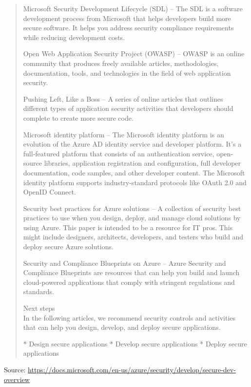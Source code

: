 \documentclass[Screen16to9,17pt]{foils}
\begin{document}
\begin{quote}\footnotesize
Microsoft Security Development Lifecycle (SDL) – The SDL is a software development process from Microsoft that helps developers build more secure software. It helps you address security compliance requirements while reducing development costs.

Open Web Application Security Project (OWASP) – OWASP is an online community that produces freely available articles, methodologies, documentation, tools, and technologies in the field of web application security.

Pushing Left, Like a Boss – A series of online articles that outlines different types of application security activities that developers should complete to create more secure code.

Microsoft identity platform – The Microsoft identity platform is an evolution of the Azure AD identity service and developer platform. It’s a full-featured platform that consists of an authentication service, open-source libraries, application registration and configuration, full developer documentation, code samples, and other developer content. The Microsoft identity platform supports industry-standard protocols like OAuth 2.0 and OpenID Connect.

Security best practices for Azure solutions – A collection of security best practices to use when you design, deploy, and manage cloud solutions by using Azure. This paper is intended to be a resource for IT pros. This might include designers, architects, developers, and testers who build and deploy secure Azure solutions.

Security and Compliance Blueprints on Azure – Azure Security and Compliance Blueprints are resources that can help you build and launch cloud-powered applications that comply with stringent regulations and standards.

Next steps\\
In the following articles, we recommend security controls and activities that can help you design, develop, and deploy secure applications.

* Design secure applications
* Develop secure applications
* Deploy secure applications
\end{quote}

Source:
\url{https://docs.microsoft.com/en-us/azure/security/develop/secure-dev-overview}

\end{document}

